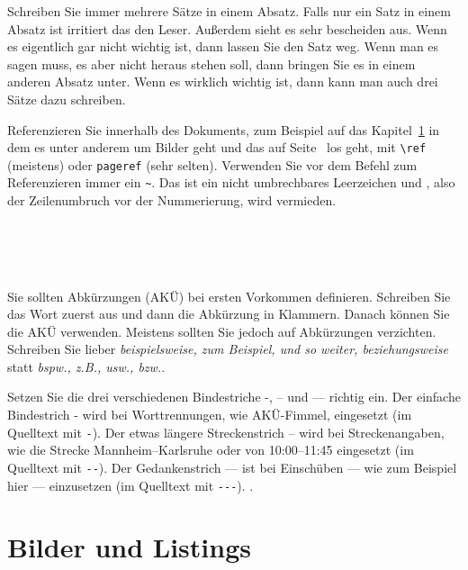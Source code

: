 \documentclass[11pt,a4paper]{report}
\begin{document}

Schreiben Sie immer mehrere Sätze in einem Absatz. 
Falls nur ein Satz in einem Absatz ist irritiert das
den Leser. 
Außerdem sieht es sehr bescheiden aus.
Wenn es eigentlich gar nicht wichtig ist, dann lassen Sie 
den Satz weg. 
Wenn man es sagen muss, es aber nicht heraus stehen soll, dann
bringen Sie es in einem anderen Absatz unter. 
Wenn es wirklich wichtig ist, dann kann man auch drei Sätze 
dazu schreiben.

Referenzieren Sie innerhalb des Dokuments, zum Beispiel
auf das Kapitel~\ref{chap:bilder} in dem es unter anderem
um Bilder geht und das auf Seite~\pageref{chap:bilder}
los geht, mit \verb|\ref| (meistens) oder 
\verb|pageref| (sehr selten). 
Verwenden Sie vor dem Befehl zum Referenzieren immer
ein \verb|~|. Das ist ein nicht umbrechbares Leerzeichen
und , also der 
Zeilenumbruch vor der Nummerierung, wird vermieden.

\newline
{}\\ 
\\
\\

Sie sollten Abkürzungen (AKÜ) bei ersten Vorkommen definieren.
Schreiben Sie das Wort zuerst aus und dann die Abkürzung in 
Klammern. 
Danach können Sie die AKÜ verwenden. 
Meistens sollten Sie jedoch auf Abkürzungen verzichten.
Schreiben Sie lieber
\textit{beispielsweise, zum Beispiel, und so weiter, beziehungsweise}
statt \textit{bspw., z.B., usw., bzw.}.

Setzen Sie die drei verschiedenen Bindestriche -, -- und --- richtig
ein. 
Der einfache Bindestrich - wird bei Worttrennungen, 
wie AKÜ-Fimmel, eingesetzt (im Quelltext mit \verb|-|).
Der etwas längere Streckenstrich -- wird bei Streckenangaben, wie
die Strecke Mannheim--Karlsruhe oder von 10:00--11:45 eingesetzt
(im Quelltext mit \verb|--|).
Der Gedankenstrich --- ist bei Einschüben --- wie zum Beispiel
hier --- einzusetzen (im Quelltext mit \verb|---|).
.

\chapter{Bilder und Listings} \label{chap:bilder}
\end{document}
